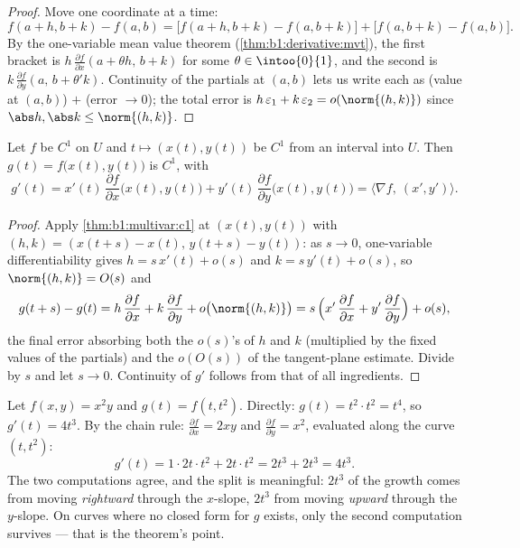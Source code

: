 \begin{proof}
Move one coordinate at a time:
\[
f(a+h, b+k) - f(a,b)
= \bigl[f(a+h, b+k) - f(a, b+k)\bigr] + \bigl[f(a, b+k) -
f(a,b)\bigr].
\]
By the one-variable mean value theorem
(\cref{thm:b1:derivative:mvt}), the first bracket is $h\,
\frac{\partial f}{\partial x}(a + \theta h,\, b + k)$ for some
$\theta \in \intoo{0}{1}$, and the second is $k\,\frac{\partial
f}{\partial y}(a,\, b + \theta' k)$. Continuity of the partials at
$(a,b)$ lets us write each as (value at $(a,b)$) $+$
(error $\to 0$); the total error is $h\,\varepsilon_1 +
k\,\varepsilon_2 = o(\norm{(h,k)})$ since $\abs h, \abs k \leq
\norm{(h,k)}$.
\end{proof}

\begin{theorem}\label{thm:b1:multivar:chain}
Let $f$ be $C^1$ on $U$ and $t \mapsto (x(t), y(t))$ be $C^1$ from
an interval into $U$. Then $g(t) = f\bigl(x(t), y(t)\bigr)$ is
$C^1$, with
\[
g'(t) = x'(t)\,\frac{\partial f}{\partial x}\bigl(x(t),y(t)\bigr)
+ y'(t)\,\frac{\partial f}{\partial y}\bigl(x(t),y(t)\bigr)
= \bigl\langle \nabla f,\ (x', y')\bigr\rangle .
\]
\end{theorem}

\begin{proof}
Apply \cref{thm:b1:multivar:c1} at $(x(t), y(t))$ with $(h, k) =
(x(t+s) - x(t),\, y(t+s) - y(t))$: as $s \to 0$, one-variable
differentiability gives $h = s\,x'(t) + o(s)$ and $k = s\,y'(t)
+ o(s)$, so $\norm{(h, k)} = O(s)$ and
\[
g(t+s) - g(t)
= h\,\frac{\partial f}{\partial x} + k\,\frac{\partial
f}{\partial y} + o\bigl(\norm{(h,k)}\bigr)
= s\,\Bigl(x'\,\frac{\partial f}{\partial x} +
y'\,\frac{\partial f}{\partial y}\Bigr) + o(s) ,
\]
the final error absorbing both the $o(s)$'s of $h$ and $k$
(multiplied by the fixed values of the partials) and the
$o(O(s))$ of the tangent-plane estimate. Divide by $s$ and let
$s \to 0$. Continuity of $g'$ follows from that of all
ingredients.
\end{proof}

\begin{example}
\label{ex:b1:multivar:chainrun}
Let $f(x, y) = x^2 y$ and $g(t) = f(t, t^2)$. Directly: $g(t) =
t^2\cdot t^2 = t^4$, so $g'(t) = 4t^3$. By the chain rule:
$\frac{\partial f}{\partial x} = 2xy$ and $\frac{\partial
f}{\partial y} = x^2$, evaluated along the curve $(t, t^2)$:
\[
g'(t) = 1\cdot 2t\cdot t^2 + 2t\cdot t^2 = 2t^3 + 2t^3 = 4t^3 .
\]
The two computations agree, and the split is meaningful: $2t^3$
of the growth comes from moving \emph{rightward} through the
$x$-slope, $2t^3$ from moving \emph{upward} through the
$y$-slope. On curves where no closed form for $g$ exists, only
the second computation survives --- that is the theorem's point.
\end{example}

